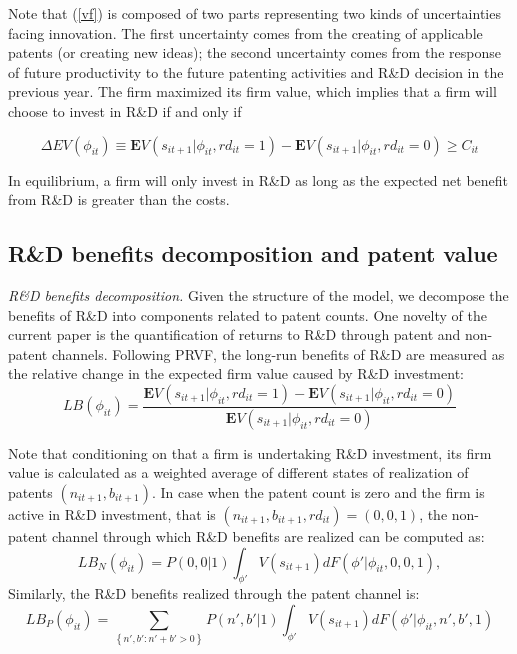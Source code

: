 \documentclass[11pt]{article}
\begin{document}
Note that (\ref{vf}) is composed of two parts representing two kinds of uncertainties facing innovation. The first uncertainty comes from the creating of applicable patents (or creating new ideas); the second uncertainty comes from the response of future productivity to the future patenting activities and R\&D decision in the previous year. The firm maximized its firm value, which implies that a firm will choose to invest in R\&D if and only if

\begin{equation}
    \Delta EV(\phi_{it}) \equiv \mathbf{E} V(s_{it+1}|\phi_{it}, rd_{it}=1)-\mathbf{E} V(s_{it+1}|\phi_{it},rd_{it}=0)\geq C_{it}
\end{equation}

In equilibrium, a firm will only invest in R\&D as long as the expected net benefit from R\&D is greater than the costs.

\subsection{R\&D benefits decomposition and patent value}
\textit{R\&D benefits decomposition.} Given the structure of the model, we decompose the benefits of R\&D into components related to patent counts. One novelty of the current paper is the quantification of returns to R\&D through patent and non-patent channels. Following PRVF, the long-run benefits of R\&D are measured as the relative change in the expected firm value caused by R\&D investment:
\begin{equation}
    LB(\phi_{it}) = \frac{\mathbf{E}V(s_{it+1}|\phi_{it}, rd_{it}=1)-\mathbf{E}V(s_{it+1}|\phi_{it}, rd_{it}=0)}{\mathbf{E}V(s_{it+1}|\phi_{it}, rd_{it}=0)}
\end{equation}

Note that conditioning on that a firm is undertaking R\&D investment, its firm value is calculated as a weighted average of different states of realization of patents $(n_{it+1}, b_{it+1})$. In case when the patent count is zero and the firm is active in R\&D investment, that is $(n_{it+1}, b_{it+1}, rd_{it})=(0, 0, 1)$, the non-patent channel through which R\&D benefits are realized can be computed as:
\begin{equation} \label{LB_N}
    LB_N(\phi_{it}) = P(0,0|1)\int_{\phi'}V(s_{it+1})dF(\phi'|\phi_{it}, 0, 0, 1),
\end{equation}
Similarly, the R\&D benefits realized through the patent channel is:
\begin{equation} \label{LB_P}
    LB_P(\phi_{it}) = \sum_{\left\{n',b': n' + b' >0\right\}}P(n',b'|1)\int_{\phi'}V(s_{it+1})dF(\phi'|\phi_{it}, n', b', 1)
\end{equation}
\end{document}
